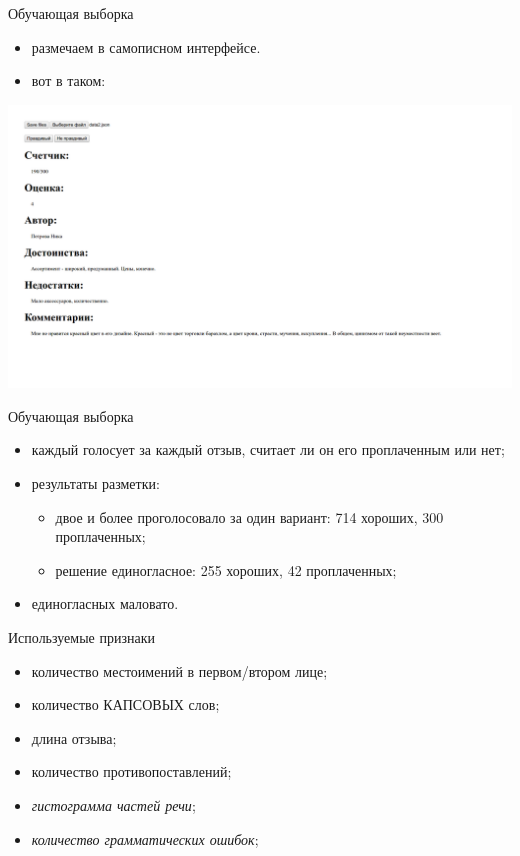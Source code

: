 \documentclass[mathserif,utf8,14pt]{beamer}
\begin{document}
\begin{frame}{Обучающая выборка}
\begin{itemize}
         \item размечаем в самописном интерфейсе.
         \item вот в таком:
     \end{itemize}
     \includegraphics[width=\linewidth]{labeling_interface.png}
\end{frame}

\begin{frame}{Обучающая выборка}
     \begin{itemize}
	 \item каждый голосует за каждый отзыв, считает ли он его проплаченным или нет;
         \item результаты разметки:
	 \begin{itemize}	
              \item двое и более проголосовало за один вариант: 714 хороших, 300 проплаченных;
              \item решение единогласное: 255 хороших, 42 проплаченных;
 	 \end{itemize}
	 \item единогласных маловато.
     \end{itemize}
\end{frame}

\begin{frame}{Используемые признаки}
    \begin{itemize}
        \item количество местоимений в первом/втором лице;
        \item количество КАПСОВЫХ слов;
        \item длина отзыва;
        \item количество противопоставлений;
        \item \textit{гистограмма частей речи};
        \item \textit{количество грамматических ошибок};
    \end{itemize}
\end{frame}
\end{document}
